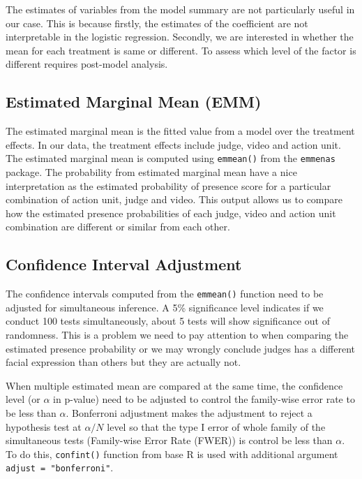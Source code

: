 \documentclass{monashthesis}
\begin{document}
The estimates of variables from the model summary are not particularly useful in our case. This is because firstly, the estimates of the coefficient are not interpretable in the logistic regression. Secondly, we are interested in whether the mean for each treatment is same or different. To assess which level of the factor is different requires post-model analysis.

\hypertarget{estimated-marginal-mean-emm}{%
\subsection{Estimated Marginal Mean (EMM)}\label{estimated-marginal-mean-emm}}

The estimated marginal mean \autocite{gelman2006data} is the fitted value from a model over the treatment effects. In our data, the treatment effects include judge, video and action unit. The estimated marginal mean is computed using \texttt{emmean()} from the \texttt{emmenas} package. The probability from estimated marginal mean have a nice interpretation as the estimated probability of presence score for a particular combination of action unit, judge and video. This output allows us to compare how the estimated presence probabilities of each judge, video and action unit combination are different or similar from each other.

\hypertarget{confidence-interval-adjustment}{%
\subsection{Confidence Interval Adjustment}\label{confidence-interval-adjustment}}

The confidence intervals computed from the \texttt{emmean()} function need to be adjusted for simultaneous inference. A 5\% significance level indicates if we conduct 100 tests simultaneously, about 5 tests will show significance out of randomness. This is a problem we need to pay attention to when comparing the estimated presence probability or we may wrongly conclude judges has a different facial expression than others but they are actually not.

When multiple estimated mean are compared at the same time, the confidence level (or \(\alpha\) in p-value) need to be adjusted to control the family-wise error rate to be less than \(\alpha\). Bonferroni adjustment makes the adjustment to reject a hypothesis test at \(\alpha/N\) level so that the type I error of whole family of the simultaneous tests (Family-wise Error Rate (FWER)) is control be less than \(\alpha\). To do this, \texttt{confint()} function from base R is used with additional argument \texttt{adjust\ =\ "bonferroni"}.
\end{document}
